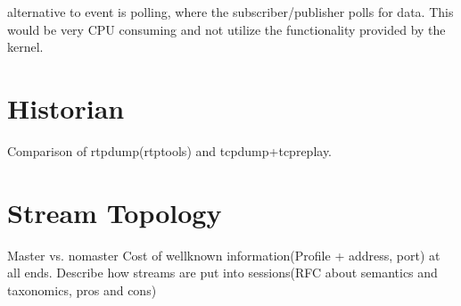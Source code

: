 alternative to event is polling, where the subscriber/publisher polls for data. This would be very CPU consuming and not utilize the functionality provided by the kernel.


\section{Historian}

Comparison of rtpdump(rtptools) and tcpdump+tcpreplay.

\begin{table}[H]
\centering
{}
\caption{My caption}
\label{my-label}
\end{table}
\section{Stream Topology}

Master vs. nomaster
Cost of wellknown information(Profile + address, port) at all ends.
Describe how streams are put into sessions(RFC about semantics and taxonomics, pros and cons)

